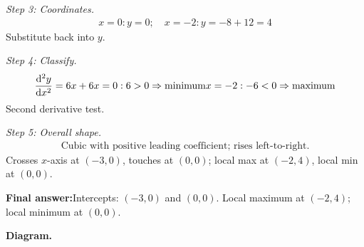 \documentclass[11pt]{article}
\begin{document}
\textit{Step 3: Coordinates.}
\[\begin{gathered}
x=0: y=0; \quad x=-2: y = -8 + 12 = 4
\end{gathered}\]
Substitute back into \( y \).

\textit{Step 4: Classify.}
\[\begin{gathered}
\frac{\mathrm{d}^2y}{\mathrm{d}x^2} = 6x + 6 \newline x=0: 6>0 \Rightarrow \text{minimum} \newline x=-2: -6<0 \Rightarrow \text{maximum}
\end{gathered}\]
Second derivative test.

\textit{Step 5: Overall shape.}
\[\begin{gathered}
\text{Cubic with positive leading coefficient; rises left-to-right.}
\end{gathered}\]
Crosses \(x\)-axis at \((-3, 0)\), touches at \((0, 0)\); local max at \((-2, 4)\), local min at \((0, 0)\).

\begin{answerbox}
\textbf{Final answer:}\quad Intercepts: \(\displaystyle  (-3, 0) \) and \(\displaystyle  (0, 0) \). Local maximum at \(\displaystyle  (-2, 4) \); local minimum at \(\displaystyle  (0, 0) \).
\end{answerbox}
\textbf{Diagram.}
\end{document}
